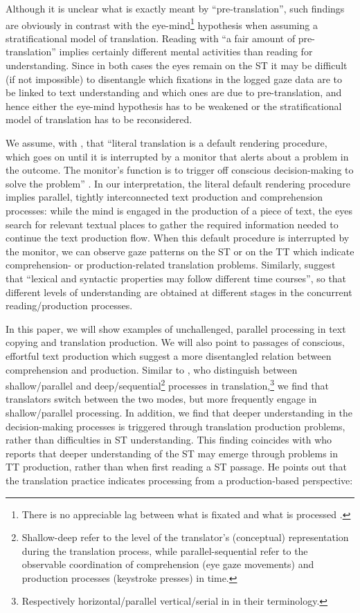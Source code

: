 \documentclass[output=paper]{LSP/langsci}
\begin{document}
Although it is unclear what is exactly meant by ``pre-translation'', such findings are obviously in contrast with the eye-mind\footnote{There is no appreciable lag between what is fixated and what is processed \citep{Just1984}.} hypothesis when assuming a stratificational model of translation. Reading with ``a fair amount of pre-translation'' implies certainly different mental activities than reading for understanding. Since in both cases the eyes remain on the ST it may be difficult (if not impossible) to disentangle which fixations in the logged gaze data are to be linked to text understanding and which ones are due to pre-translation, and hence either the eye-mind hypothesis has to be weakened or the stratificational model of translation has to be reconsidered. 

We assume, with \citeauthor{Tirkkonen-Condit2005}, that ``literal translation is a default rendering procedure, which goes on until it is interrupted by a monitor that alerts about a problem in the outcome. The monitor's function is to trigger off conscious decision-making to solve the problem'' \citep[407-408]{Tirkkonen-Condit2005}. In our interpretation, the literal default rendering procedure implies parallel, tightly interconnected text production and comprehension processes: while the mind is engaged in the production of a piece of text, the eyes search for relevant textual places to gather the required information needed to continue the text production flow. When this default procedure is interrupted by the monitor, we can observe gaze patterns on the ST or on the TT which indicate comprehension- or production-related translation problems. Similarly, \citet{RuizEtAl2008} suggest that ``lexical and syntactic properties may follow different time courses'', so that different levels of understanding are obtained at different stages in the concurrent reading/production processes.

In this paper, we will show examples of unchallenged, parallel processing in text copying and translation production. We will also point to passages of conscious, effortful text production which suggest a more disentangled relation between comprehension and production. Similar to \citet{RuizEtAl2008}, who distinguish between shallow/parallel and deep/sequential\footnote{Shallow-deep refer to the level of the translator's (conceptual) representation during the translation process, while parallel-sequential refer to the observable coordination of comprehension (eye gaze movements) and  production processes (keystroke presses) in time.} processes in translation,\footnote{Respectively horizontal/parallel vertical/serial in in their terminology.} we find that translators switch between the two modes, but more frequently engage in shallow/parallel processing. In addition, we find that deeper understanding in the decision-making processes is triggered through translation production problems, rather than difficulties in ST understanding. This finding coincides with \citet[110]{Gile1995} who reports that deeper understanding of the ST may emerge through problems in TT production, rather than when first reading a ST passage. He points out that the translation practice indicates processing from a production-based perspective:
\end{document}
